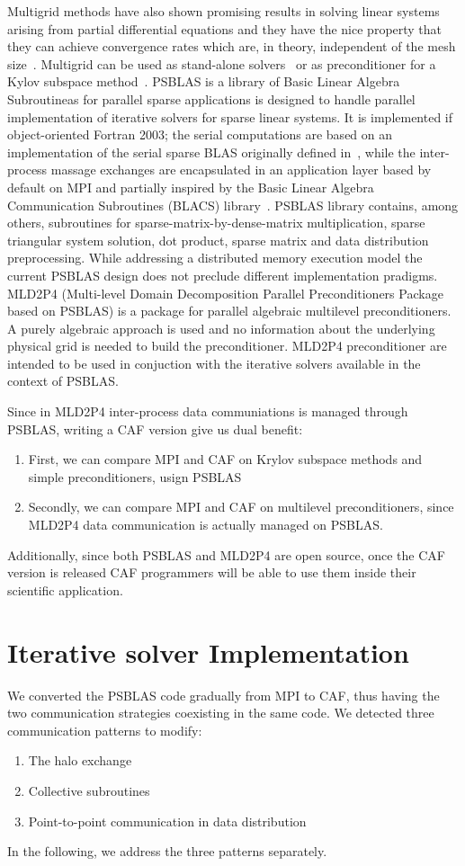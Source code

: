 \documentclass{IOS-Book-Article}
\begin{document}
Multigrid methods have also shown promising results in solving linear
systems arising from partial differential equations and they have the
nice property that they can achieve convergence rates which are, in
theory, independent of the mesh size~\cite{saad2003iterative}. 
Multigrid can be used as stand-alone solvers~\cite{brandt1977multi}
or as preconditioner for a Kylov subspace
method~\cite{bramble1990parallel}.  
PSBLAS is a library of Basic Linear Algebra Subroutineas for parallel
sparse applications is designed to handle parallel implementation of
iterative solvers for sparse linear systems. It is implemented if
object-oriented Fortran 2003; the serial computations are based on an
implementation of the serial sparse BLAS originally defined
in~\cite{duff2002overview}, while the inter-process 
massage exchanges are encapsulated in an application layer based by
default on MPI and partially inspired by
the Basic Linear Algebra Communication Subroutines (BLACS)
library~\cite{whaley1997user}. PSBLAS library contains, among 
others, 
subroutines for sparse-matrix-by-dense-matrix multiplication, sparse
triangular system solution, dot product, sparse matrix and data
distribution preprocessing. 
While addressing a distributed memory execution model the current
PSBLAS design does not preclude different implementation pradigms. 
MLD2P4 (Multi-level Domain Decomposition Parallel Preconditioners
Package based on PSBLAS) is a package for parallel algebraic
multilevel preconditioners. A purely algebraic approach is used and no
information about the underlying physical grid is needed to build the
preconditioner. MLD2P4 preconditioner are intended to be used in
conjuction with the iterative solvers available in the context of
PSBLAS.

Since in MLD2P4 inter-process data communiations is managed through
PSBLAS, writing a CAF version give us dual benefit: 
\begin{enumerate}
\item First, we can compare MPI and CAF on Krylov subspace methods and simple preconditioners, usign PSBLAS
\item Secondly, we can compare MPI and CAF on multilevel preconditioners, since MLD2P4 data communication is actually managed on PSBLAS.
\end{enumerate}  
Additionally, since both PSBLAS and MLD2P4 are open source, once the
CAF version is released CAF programmers will be able to use them
inside their scientific application. 

 
\section{Iterative solver Implementation}
We converted the PSBLAS code gradually from MPI to CAF, thus having
the two communication strategies coexisting in the same code.  
We detected three communication patterns to modify:
\begin{enumerate}
\item The halo exchange
\item Collective subroutines
\item Point-to-point communication in data distribution
\end{enumerate}
In the following, we address the three patterns  separately.
\end{document}
